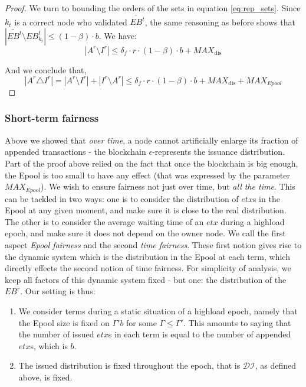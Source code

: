 \begin{proof}
We turn to bounding the orders of the sets in equation \ref{eq:rep_sets}. Since $k_t$ is a correct node who validated $\widetilde{EB^t}$, the same reasoning as before shows that $\left |\widetilde{EB^t}\setminus EB^t_{k_t}\right |\leq (1-\beta)\cdot b$. We have:
\begin{equation} 
|A^r\setminus I^r |\leq \delta_f\cdot r \cdot (1-\beta)\cdot b+MAX_\text{dis}
\end{equation}

And we conclude that, 
\begin{equation}\label{eq:rep_symbound}|A^r \triangle I^{r}|= |A^r\setminus I^{r}|+|I^{r}\setminus A^r|\leq \delta_f\cdot r \cdot (1-\beta)\cdot b+MAX_\text{dis}+ MAX_{Epool}
\end{equation}
\end{proof}

\subsubsection*{Short-term fairness}
Above we showed that \emph{over time}, a node cannot artificially enlarge its fraction of appended transactions - the blockchain $\epsilon$-represents the issuance distribution. Part of the proof above relied on the fact that once the blockchain is big enough, the Epool is too small to have any effect (that was expressed by the parameter $MAX_{Epool}$). We wish to ensure fairness not just over time, but \emph{all the time}. This can be tackled in two ways: one is to consider the distribution of $etx$s in the Epool at any given moment, and make sure it is close to the real distribution. The other is to consider the average waiting time of an $etx$ during a highload epoch, and make sure it does not depend on the owner node. We call the first aspect \emph{Epool fairness} and the second \emph{time fairness}. 
These first notion gives rise to the dynamic system which is the distribution in the Epool at each term, which directly effects the second notion of time fairness. For simplicity of analysis, we keep all factors of this dynamic system fixed - but one: the distribution of the $EB^r$. Our setting is thus:  
\begin{enumerate}
	\item We consider terms during a static situation of a highload epoch, namely that the Epool size is fixed on $\Gamma' b$ for some $\Gamma\leq\Gamma'$. This amounts to saying that the number of issued $etx$s in each term is equal to the number of appended $etx$s, which is $b$.  
    \item The issued distribution is fixed throughout the epoch, that is $\mathcal{DI}$, as defined above, is fixed.  
\end{enumerate}


